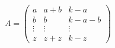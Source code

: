 \documentclass{article} %
\begin{document}
\[
A = \left( \begin{array}{lcr}
a & a+b & k-a \\
b & b & k-a-b \\
\vdots & \vdots & \vdots \\
z & z + z & k-z
\end{array}
\right)
\]
\end{document}
